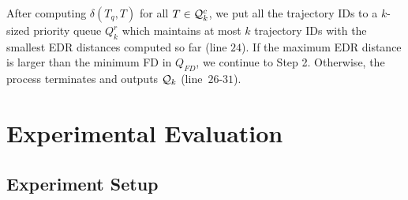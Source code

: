 \documentclass[10pt,conference,letterpaper]{IEEEtran}
\newcommand{\frname}{GAT\xspace }
\newcommand{\simq}{{{\cal Q}_k}\xspace}
\newcommand{\simcand}{{{\cal Q}_k^c}\xspace}
\newcommand{\edr}{{\delta}\xspace}
\begin{document}

After computing $\edr(T_q, T)$ for all $T\in\simcand$, we put all the trajectory IDs to a $k$-sized priority queue ${Q}_k^r$ which maintains at most $k$ trajectory IDs with the smallest EDR distances computed so far (line $24$).
If the maximum EDR distance is larger than the minimum FD in ${Q}_{FD}$, we continue to Step 2. Otherwise, the process terminates and outputs $\simq$ (line~$26$-$31$).








\section{Experimental Evaluation}\label{sec:exp}

\subsection{Experiment Setup}
\end{document}
